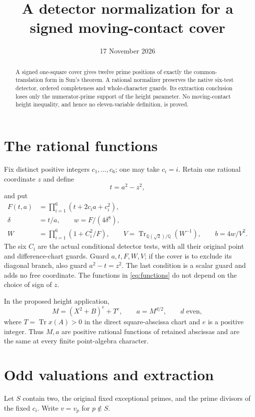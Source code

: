 \documentclass[11pt,a4paper]{article}
\title{A detector normalization for a signed moving-contact cover}
\author{}\date{17 November 2026}
\newcommand{\Q}{\mathbb Q}\newcommand{\Z}{\mathbb Z}
\DeclareMathOperator{\Tr}{Tr}
\begin{document}
\maketitle
\begin{abstract}
A signed one-square cover gives twelve prime positions of exactly
the common-translation form in Sun's theorem. A rational normalizer
preserves the native six-test detector, ordered completeness and
whole-character guards. Its extraction conclusion loses only the
numerator-prime support of the height parameter. No moving-contact
height inequality, and hence no eleven-variable definition, is proved.
\end{abstract}

\section{The rational functions}

Fix distinct positive integers $c_1,\ldots,c_6$; one may take
$c_i=i$. Retain one rational coordinate $z$ and define
\[
 t=a^2-z^2,
\]
and put
\begin{equation}\label{eq:functions}
 \begin{split}
 F(t,a)&=\prod_{i=1}^6(t+2c_i a+c_i^2),\\
 \delta&=t/a,\qquad w=F/(4\delta^8),\\
 W&=\prod_{i=1}^6(1+C_i^2/F),\qquad
 V=\Tr_{\Q(\sqrt2)/\Q}(W^{-1}),\qquad b=4w/V^2.
 \end{split}
\end{equation}
The six $C_i$ are the actual conditional detector tests, with all
their original point and difference-chart guards. Guard $a,t,F,W,V$;
if the cover is to exclude its diagonal branch, also guard
$a^2-t=z^2$. The last condition is a scalar guard and adds no free
coordinate. The functions in \eqref{eq:functions} do not depend on
the choice of sign of $z$.

In the proposed height application,
\[
 M=(X^2+B)^e+T^e,\qquad a=M^{d/2},\qquad d\text{ even},
\]
where $T=\Tr x(A)>0$ in the direct square-abscissa chart and $e$
is a positive integer. Thus $M,a$ are positive
rational functions of retained abscissas and are the same at every
finite point-algebra character.

\section{Odd valuations and extraction}

Let $S$ contain two, the original fixed exceptional primes, and the
prime divisors of the fixed $c_i$. Write $v=v_p$ for $p\notin S$.
\end{document}
